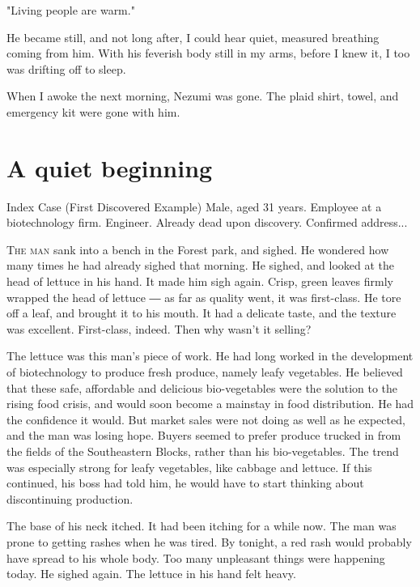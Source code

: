 "Living people are warm."

He became still, and not long after, I could hear quiet, measured
breathing coming from him. With his feverish body still in my arms,
before I knew it, I too was drifting off to sleep.

When I awoke the next morning, Nezumi was gone. The plaid shirt, towel,
and emergency kit were gone with him.

\chapter{A quiet beginning}

\begin{boxed}{Index Case (First Discovered Example)}
	Male, aged 31 years. Employee at a biotechnology firm. Engineer. Already
	dead upon discovery. Confirmed address...
\end{boxed}

\lettrine{T}{he man} sank into a bench in the Forest park, and sighed. He wondered
how many times he had already sighed that morning. He sighed, and looked
at the head of lettuce in his hand. It made him sigh again. Crisp, green
leaves firmly wrapped the head of lettuce ― as far as quality went, it
was first-class. He tore off a leaf, and brought it to his mouth. It had
a delicate taste, and the texture was excellent. First-class, indeed.
Then why wasn't it selling?

The lettuce was this man's piece of work. He had long worked in the
development of biotechnology to produce fresh produce, namely leafy
vegetables. He believed that these safe, affordable and delicious
bio-vegetables were the solution to the rising food crisis, and would
soon become a mainstay in food distribution. He had the confidence it
would. But market sales were not doing as well as he expected, and the
man was losing hope. Buyers seemed to prefer produce trucked in from the
fields of the Southeastern Blocks, rather than his bio-vegetables. The
trend was especially strong for leafy vegetables, like cabbage and
lettuce. If this continued, his boss had told him, he would have to
start thinking about discontinuing production.

The base of his neck itched. It had been itching for a while now. The
man was prone to getting rashes when he was tired. By tonight, a red
rash would probably have spread to his whole body. Too many unpleasant
things were happening today. He sighed again. The lettuce in his hand
felt heavy.

